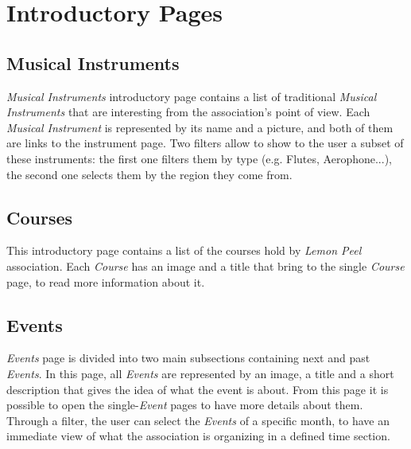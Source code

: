 \documentclass[../../DD.tex]{subfiles}
\begin{document}
\section{Introductory Pages \label{sect:2.1}}
	\subsection{Musical Instruments}
		\textit{Musical Instruments} introductory page contains a list of traditional \textit{Musical Instruments} that are interesting from the association's point of view. Each \textit{Musical Instrument} is represented by its name and a picture, and both of them are links to the instrument page. Two filters allow to show to the user a subset of these instruments: the first one filters them by type (e.g. Flutes, Aerophone...), the second one selects them by the region they come from.
		\newline

	\subsection{Courses}
		This introductory page contains a list of the courses hold by \textit{Lemon Peel} association. Each \textit{Course} has an image and a title that bring to the single \textit{Course} page, to read more information about it.
		\newline

	\subsection{Events}
		\textit{Events} page is divided into two main subsections containing next and past \textit{Events}. In this page, all \textit{Events} are represented by an image, a title and a short description that gives the idea of what the event is about. From this page it is possible to open the single-\textit{Event} pages to have more details about them. Through a filter, the user can select the \textit{Events} of a specific month, to have an immediate view of what the association is organizing in a defined time section.
		\newline

	
\end{document}

